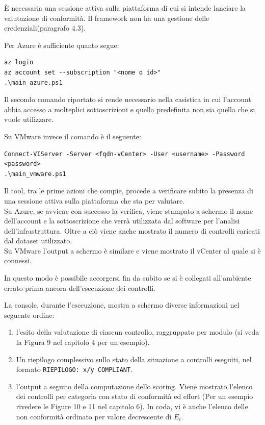 \documentclass[a4paper,11pt]{report}
\begin{document}
È necessaria una sessione attiva sulla piattaforma di cui si intende lanciare la valutazione di conformità. Il framework non ha una gestione delle credenziali(paragrafo 4.3).

Per Azure è sufficiente quanto segue:

\begin{lstlisting}[style=azcli]
az login
az account set --subscription "<nome o id>"
.\main_azure.ps1
\end{lstlisting}

Il secondo comando riportato si rende necessario nella casistica in cui l'account abbia accesso a molteplici sottoscrizioni e quella predefinita non sia quella che si vuole utilizzare.

Su VMware invece il comando è il seguente:

\begin{lstlisting}[style=azcli]
Connect-VIServer -Server <fqdn-vCenter> -User <username> -Password <password>
.\main_vmware.ps1
\end{lstlisting}

Il tool, tra le prime azioni che compie, procede a verificare subito la presenza di una sessione attiva sulla piattaforma che sta per valutare.\\
Su Azure, se avviene con successo la verifica, viene stampato a schermo il nome dell'account e la sottoscrizione che verrà utilizzata dal software per l'analisi dell'infrastruttura. Oltre a ciò viene anche mostrato il numero di controlli caricati dal dataset utilizzato.\\
Su VMware l'output a schermo è similare e viene mostrato il vCenter al quale si è connessi.

In questo modo è possibile accorgersi fin da subito se si è collegati all'ambiente errato prima ancora dell'esecuzione dei controlli.

La console, durante l'esecuzione, mostra a schermo diverse informazioni nel seguente ordine:

\begin{enumerate}
\item l'esito della valutazione di ciascun controllo, raggruppato per modulo (si veda la Figura 9 nel capitolo 4 per un esempio).
\item Un riepilogo complessivo sullo stato della situazione a controlli eseguiti, nel formato \texttt{RIEPILOGO: x/y COMPLIANT}.
\item l'output a seguito della computazione dello scoring. Viene mostrato l'elenco dei controlli per categoria con stato di conformità ed effort (Per un esempio rivedere le Figure 10 e 11 nel capitolo 6). In coda, vi è anche l'elenco delle non conformità ordinato per valore decrescente di $E_i$.
\end{enumerate}
\end{document}
